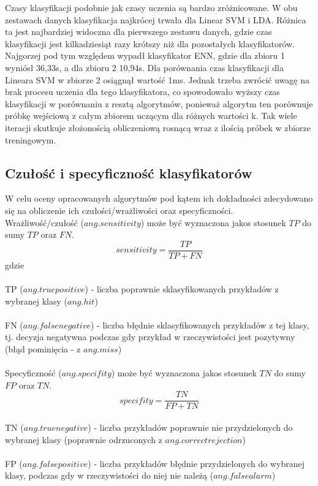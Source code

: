 \documentclass[[10pt,a4paper]{article}
\begin{document}
Czasy klasyfikacji podobnie jak czasy uczenia są bardzo zróżnicowane. W obu zestawach danych klasyfikacja najkrócej trwała dla Linear SVM i LDA. Różnica ta jest najbardziej widoczna dla pierwszego zestawu danych, gdzie czas klasyfikacji jest kilkadziesiąt razy krótszy niż dla pozostałych klasyfikatorów. Najgorzej pod tym względem wypadł klasyfikator ENN, gdzie dla zbioru 1 wyniósł 36,33s, a dla zbioru 2 10,94s. Dla porównania czas klasyfikacji dla Lineara SVM w zbiorze 2 osiągnął wartość 1ms. Jednak trzeba zwrócić uwagę na brak procesu uczenia dla tego klasyfikatora, co spowodowało wyższy czas klasyfikacji w porównaniu z resztą algorytmów, ponieważ algorytm ten porównuje próbkę wejściową z całym zbiorem uczącym dla różnych wartości k. Tak wiele iteracji skutkuje złożonością obliczeniową rosnącą wraz z ilością próbek w zbiorze treningowym. 

\subsection{Czułość i specyficzność klasyfikatorów}

W celu oceny opracowanych algorytmów pod kątem ich dokładności zdecydowano się na obliczenie ich czułości/wrażliwości oraz specyficzności.\\

Wrażliwość/czułość ($ang. sensitivity$) może być wyznaczona jakos stosunek $TP$ do sumy $TP$ oraz $FN$.
 $$
sensitivity = \frac{TP}{TP + FN}
$$
gdzie\\
\\
TP ($ang. true positive$) - liczba poprawnie sklasyfikowanych przykładów z wybranej klasy ($ang. hit$)\\
\\
FN ($ang. false negative$) - liczba błędnie sklasyfikowanych przykładów z tej klasy, tj. decyzja negatywna podczas gdy przykład w rzeczywistości jest pozytywny (błąd pominięcia - z $ang. miss$)\\
\\
Specyficzność ($ang. specifity$) może być wyznaczona jakos stosunek $TN$ do sumy $FP$ oraz $TN$.\\
 $$
specifity = \frac{TN}{FP + TN}
$$
\\
TN ($ang. true negative$) - liczba przykładów poprawnie nie przydzielonych do wybranej klasy (poprawnie odrzuconych z $ang. correct rejection$)\\
\\
FP ($ang. false positive$) - liczba przykładów błędnie przydzielonych do wybranej klasy, podczas gdy w rzeczywistości do niej nie należą ($ang. false alarm$)\\
\end{document}
